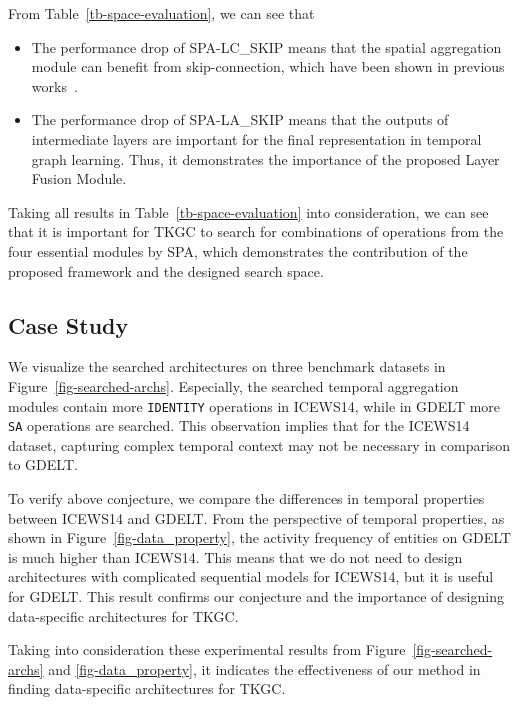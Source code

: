 \documentclass[11pt]{article}
\begin{document}
From Table~\ref{tb-space-evaluation},
we can see that

\begin{itemize}
	\item The performance drop of SPA-LC\_SKIP means that the spatial aggregation module can benefit from skip-connection, which have been shown in previous works~\cite{li2021deepgcns,li2020autograph}.
	\vspace{-5px}
	\item The performance drop of SPA-LA\_SKIP means that the outputs of intermediate layers are important for the final representation in temporal graph learning. Thus, it demonstrates the importance of the proposed Layer Fusion Module.
\end{itemize}

Taking all results in Table~\ref{tb-space-evaluation} into consideration, 
we can see that it is important for TKGC 
to search for combinations of operations 
from the four essential modules by SPA, 
which demonstrates the contribution of the proposed framework and the designed search space.

\subsection{Case Study}\label{sec:case-study}

We visualize the searched architectures 
on three benchmark datasets in Figure~\ref{fig-searched-archs}.
Especially,
the searched temporal aggregation modules contain more \texttt{IDENTITY} operations in ICEWS14,
while in GDELT more \texttt{SA} operations are searched.
This observation implies that 
for the ICEWS14 dataset, 
capturing complex temporal context may not be necessary 
in comparison to GDELT.

To verify above conjecture, 
we compare the differences in temporal properties between ICEWS14 and GDELT.  
From the perspective of temporal properties, 
as shown in Figure~\ref{fig-data_property}, 
the activity frequency of entities on GDELT is much higher than ICEWS14.
This means that 
we do not need to design architectures 
with complicated sequential models 
for ICEWS14, 
but it is useful for GDELT.
This result confirms our conjecture and the importance of designing data-specific architectures for TKGC.

Taking into consideration these experimental results from Figure~\ref{fig-searched-archs} and \ref{fig-data_property},
it indicates the effectiveness of our method 
in finding data-specific architectures for TKGC. 
\end{document}
